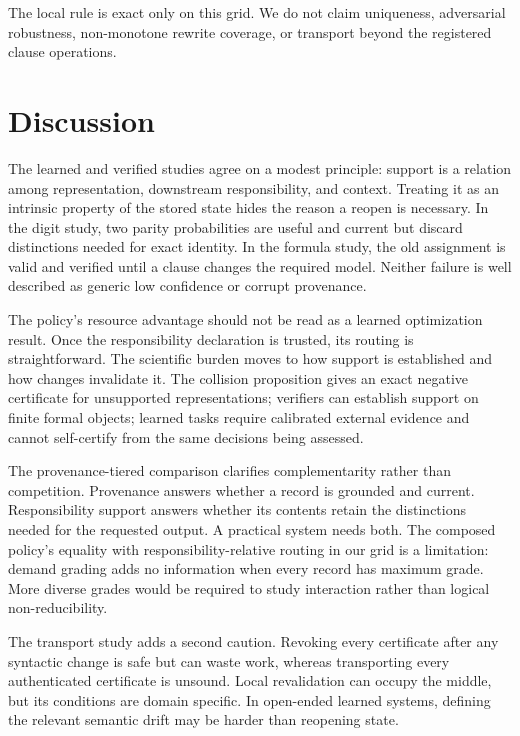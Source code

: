 \documentclass[10pt]{article}
\begin{document}
The local rule is exact only on this grid. We do not claim uniqueness, adversarial robustness, non-monotone rewrite coverage, or transport beyond the registered clause operations.

\section{Discussion}

The learned and verified studies agree on a modest principle: support is a relation among representation, downstream responsibility, and context. Treating it as an intrinsic property of the stored state hides the reason a reopen is necessary. In the digit study, two parity probabilities are useful and current but discard distinctions needed for exact identity. In the formula study, the old assignment is valid and verified until a clause changes the required model. Neither failure is well described as generic low confidence or corrupt provenance.

The policy's resource advantage should not be read as a learned optimization result. Once the responsibility declaration is trusted, its routing is straightforward. The scientific burden moves to how support is established and how changes invalidate it. The collision proposition gives an exact negative certificate for unsupported representations; verifiers can establish support on finite formal objects; learned tasks require calibrated external evidence and cannot self-certify from the same decisions being assessed.

The provenance-tiered comparison clarifies complementarity rather than competition. Provenance answers whether a record is grounded and current. Responsibility support answers whether its contents retain the distinctions needed for the requested output. A practical system needs both. The composed policy's equality with responsibility-relative routing in our grid is a limitation: demand grading adds no information when every record has maximum grade. More diverse grades would be required to study interaction rather than logical non-reducibility.

The transport study adds a second caution. Revoking every certificate after any syntactic change is safe but can waste work, whereas transporting every authenticated certificate is unsound. Local revalidation can occupy the middle, but its conditions are domain specific. In open-ended learned systems, defining the relevant semantic drift may be harder than reopening state.
\end{document}
